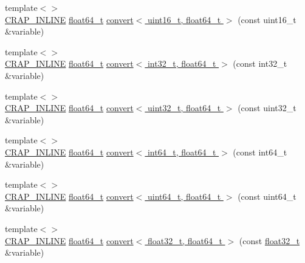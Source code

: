 \begin{DoxyCompactItemize}
{\footnotesize template$<$$>$ }\\\hyperlink{config__x86_8h_a5a40526b8d842e7ff731509998bb0f1c}{C\+R\+A\+P\+\_\+\+I\+N\+L\+I\+N\+E} \hyperlink{crap__types_8h_ac55f3ae81b5bc9053760baacf57e47f4}{float64\+\_\+t} \hyperlink{namespacecrap_adc836efacbd81c9ddbfa77aa737186c3}{convert$<$ uint16\+\_\+t, float64\+\_\+t $>$} (const uint16\+\_\+t \&variable)
\item 
{\footnotesize template$<$$>$ }\\\hyperlink{config__x86_8h_a5a40526b8d842e7ff731509998bb0f1c}{C\+R\+A\+P\+\_\+\+I\+N\+L\+I\+N\+E} \hyperlink{crap__types_8h_ac55f3ae81b5bc9053760baacf57e47f4}{float64\+\_\+t} \hyperlink{namespacecrap_aaf6c71939e5941484b4c6a145985b7a6}{convert$<$ int32\+\_\+t, float64\+\_\+t $>$} (const int32\+\_\+t \&variable)
\item 
{\footnotesize template$<$$>$ }\\\hyperlink{config__x86_8h_a5a40526b8d842e7ff731509998bb0f1c}{C\+R\+A\+P\+\_\+\+I\+N\+L\+I\+N\+E} \hyperlink{crap__types_8h_ac55f3ae81b5bc9053760baacf57e47f4}{float64\+\_\+t} \hyperlink{namespacecrap_ab0354af840bafa0d745b9ceffdf7387a}{convert$<$ uint32\+\_\+t, float64\+\_\+t $>$} (const uint32\+\_\+t \&variable)
\item 
{\footnotesize template$<$$>$ }\\\hyperlink{config__x86_8h_a5a40526b8d842e7ff731509998bb0f1c}{C\+R\+A\+P\+\_\+\+I\+N\+L\+I\+N\+E} \hyperlink{crap__types_8h_ac55f3ae81b5bc9053760baacf57e47f4}{float64\+\_\+t} \hyperlink{namespacecrap_aaa3dea60ffb48a7f8f586f6d3e317e75}{convert$<$ int64\+\_\+t, float64\+\_\+t $>$} (const int64\+\_\+t \&variable)
\item 
{\footnotesize template$<$$>$ }\\\hyperlink{config__x86_8h_a5a40526b8d842e7ff731509998bb0f1c}{C\+R\+A\+P\+\_\+\+I\+N\+L\+I\+N\+E} \hyperlink{crap__types_8h_ac55f3ae81b5bc9053760baacf57e47f4}{float64\+\_\+t} \hyperlink{namespacecrap_af79e9627671458cbbb0b8cd5ee98c329}{convert$<$ uint64\+\_\+t, float64\+\_\+t $>$} (const uint64\+\_\+t \&variable)
\item 
{\footnotesize template$<$$>$ }\\\hyperlink{config__x86_8h_a5a40526b8d842e7ff731509998bb0f1c}{C\+R\+A\+P\+\_\+\+I\+N\+L\+I\+N\+E} \hyperlink{crap__types_8h_ac55f3ae81b5bc9053760baacf57e47f4}{float64\+\_\+t} \hyperlink{namespacecrap_aff5a142b9aec57b7f243d2ad836ba228}{convert$<$ float32\+\_\+t, float64\+\_\+t $>$} (const \hyperlink{crap__types_8h_a4611b605e45ab401f02cab15c5e38715}{float32\+\_\+t} \&variable)

\end{DoxyCompactItemize}
